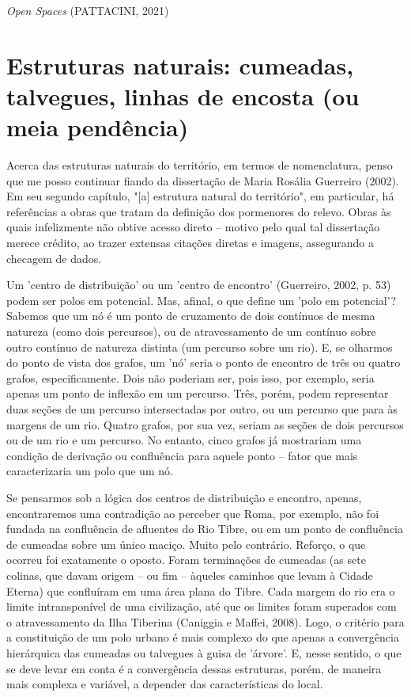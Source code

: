 \documentclass[]{report}
\begin{document}
	\textit{Open Spaces} (PATTACINI, 2021)
	
\section{Estruturas naturais: cumeadas, talvegues, linhas de encosta (ou meia pendência)}

Acerca das estruturas naturais do território, em termos de nomenclatura, penso que me posso continuar fiando da dissertação de Maria Rosália Guerreiro (2002). Em seu segundo capítulo, "[a] estrutura natural do território", em particular, há referências a obras que tratam da definição dos pormenores do relevo. Obras às quais infelizmente não obtive acesso direto – motivo pelo qual tal dissertação merece crédito, ao trazer extensas citações diretas e imagens, assegurando a checagem de dados.

Um 'centro de distribuição' ou um 'centro de encontro' (Guerreiro, 2002, p. 53) podem ser polos em potencial. Mas, afinal, o que define um 'polo em potencial'? Sabemos que um nó é um ponto de cruzamento de dois contínuos de mesma natureza (como dois percursos), ou de atravessamento de um contínuo sobre outro contínuo de natureza distinta (um percurso sobre um rio). E, se olharmos do ponto de vista dos grafos, um 'nó' seria o ponto de encontro de três ou quatro grafos, especificamente. Dois não poderiam ser, pois isso, por exemplo, seria apenas um ponto de inflexão em um percurso. Três, porém, podem representar duas seções de um percurso intersectadas por outro, ou um percurso que para às margens de um rio. Quatro grafos, por sua vez, seriam as seções de dois percursos ou de um rio e um percurso. No entanto, cinco grafos já mostrariam uma condição de derivação ou confluência para aquele ponto – fator que mais caracterizaria um polo que um nó.

Se pensarmos sob a lógica dos centros de distribuição e encontro, apenas, encontraremos uma contradição ao perceber que Roma, por exemplo, não foi fundada na confluência de afluentes do Rio Tibre, ou em um ponto de confluência de cumeadas sobre um único maciço. Muito pelo contrário. Reforço, o que ocorreu foi exatamente o oposto. Foram terminações de cumeadas (as sete colinas, que davam origem – ou fim – àqueles caminhos que levam à Cidade Eterna) que confluíram em uma área plana do Tibre. Cada margem do rio era o limite intransponível de uma civilização, até que os limites foram superados com o atravessamento da Ilha Tiberina (Caniggia e Maffei, 2008). Logo, o critério para a constituição de um polo urbano é mais complexo do que apenas a convergência hierárquica das cumeadas ou talvegues à guisa de 'árvore'. E, nesse sentido, o que se deve levar em conta é a convergência dessas estruturas, porém, de maneira mais complexa e variável, a depender das características do local.
\end{document}
